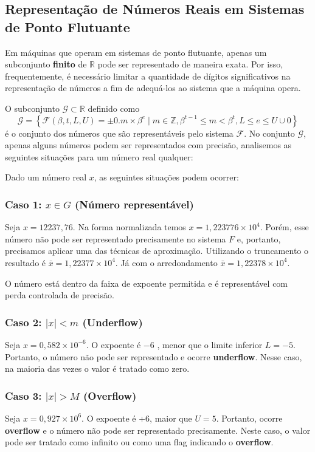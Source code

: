 \subsection{Representação de Números Reais em Sistemas de Ponto Flutuante}

Em máquinas que operam em sistemas de ponto flutuante, apenas um subconjunto
\textbf{finito} de $\mathbb{R}$ pode ser representado de maneira exata. Por
isso, frequentemente, é necessário limitar a quantidade de dígitos
significativos na representação de números a fim de adequá-los ao sistema que a
máquina opera.

O subconjunto $\mathcal{G} \subset \mathbb{R}$ definido como
\[
  \mathcal{G} = \left\{ \mathcal{F}(\beta,t,L,U)={\pm 0.m \times \beta^e \mid m \in \mathbb{Z}, \beta^{t-1} \le m < \beta^t, L \leq e \leq U}\cup{0} \right\}
\]
é o conjunto dos números que são representáveis pelo sistema $\mathcal{F}$. No conjunto $\mathcal{G}$, apenas alguns números podem ser representados com
precisão, analisemos as seguintes situações para um número real qualquer:

Dado um número real $x$, as seguintes situações podem ocorrer:

\subsubsection*{Caso 1: \( x \in G \) (Número representável)}
Seja $x = 12237,76$. Na forma normalizada temos \(x = 1,223776 \times10^4\). Porém, esse número não pode ser representado precisamente no sistema $F$ e, portanto, precisamos aplicar uma das técnicas de aproximação. Utilizando o truncamento o resultado é \( \bar{x} = 1{,}22377 \times 10^4 \). Já com o arredondamento \( \bar{x} = 1{,}22378 \times 10^4 \).

O número está dentro da faixa de expoente permitida e é representável com perda
controlada de precisão.

\subsubsection*{Caso 2: \( |x| < m \) (Underflow)}
Seja \( x = 0{,}582 \times 10^{-6} \). O expoente é \(-6\) , menor que o limite inferior $L = -5$. Portanto, o número não pode ser representado e ocorre \textbf{underflow}. Nesse caso, na maioria das vezes o valor é tratado como zero.

\subsubsection*{Caso 3: \( |x| > M \) (Overflow)}
Seja \( x = 0{,}927 \times 10^6 \). O expoente é +6, maior que $U = 5$. Portanto, ocorre \textbf{overflow} e o número não pode ser representado precisamente. Neste caso, o valor pode ser tratado como infinito ou como uma flag indicando o \textbf{overflow}.


